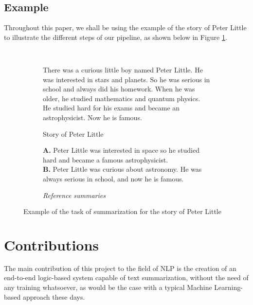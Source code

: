 

\subsection{Example}

Throughout this paper, we shall be using the example of the story of Peter Little to illustrate the different steps of our pipeline, as shown below in Figure \ref{fig:peter_little}.

\begin{figure}[H]\
\begin{subfigure}{\textwidth}
\begin{displayquote}
There was a curious little boy named Peter Little. He was interested in stars and planets. So he was serious in school and always did his homework. When he was older, he studied mathematics and quantum physics. He studied hard for his exams and became an astrophysicist. Now he is famous.
\end{displayquote}
\caption{Story of Peter Little}
\vspace{\baselineskip}
\end{subfigure}
\begin{subfigure}{\textwidth}
\begin{displayquote}
\textbf{A.} Peter Little was interested in space so he studied hard and became a famous astrophysicist.\\
\textbf{B.} Peter Little was curious about astronomy. He was always serious in school, and now he is famous.
\caption{\textit{Reference summaries}}
\end{displayquote}
\end{subfigure}
\caption{Example of the task of summarization for the story of Peter Little}
\label{fig:peter_little}
\end{figure}

\section{Contributions}

The main contribution of this project to the field of NLP is the creation of an end-to-end logic-based system capable of text summarization, without the need of any training whatsoever, as would be the case with a typical Machine Learning-based approach these days.

